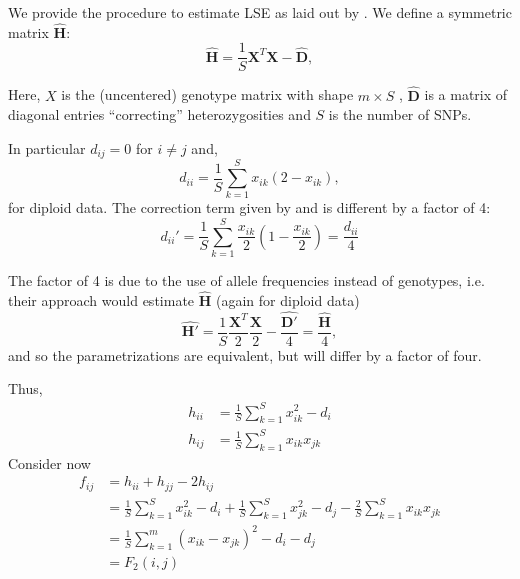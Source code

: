 \documentclass[12pt, letterpaper]{article}
\begin{document}
We provide the procedure to estimate LSE as laid out by \cite{cabreros_likelihood-free_2019}. We define a symmetric matrix $\hat{\mathbf{H}}$:
\begin{equation}
    \hat{\mathbf{H}} = \frac{1}{S}\mathbf{X}^T\mathbf{X} - \hat{\mathbf{D}},
\end{equation}

Here, $X$ is the (uncentered) genotype matrix with shape $m \times S$ , $\hat{\mathbf{D}}$ is a matrix of diagonal entries ``correcting'' heterozygosities and $S$ is the number of SNPs.

In particular $d_{ij} = 0 $ for $i \neq j$ and, 
\begin{equation}
    d_{ii} = \frac{1}{S}\sum_{k=1}^S x_{ik}(2-x_{ik}),
\end{equation}
for diploid data. The correction term given by \cite{reich_reconstructing_2009} and \cite{patterson_ancient_2012} is different by a factor of 4:
\begin{equation*}
    d_{ii}' = \frac{1}{S}\sum_{k=1}^S \frac{x_{ik}}{2}(1-\frac{x_{ik}}{2}) = \frac{d_{ii}}{4}
\end{equation*}

The factor of 4 is due to the use of allele frequencies instead of genotypes, i.e. their approach would estimate $\hat{\mathbf{H}}$ (again for diploid data)
\begin{equation*}
    \hat{\mathbf{H}'} = \frac{1}{S}\frac{\mathbf{X}^T}{2}\frac{\mathbf{X}}{2} - \frac{\hat{\mathbf{D'}}}{4} = \frac{\hat{\mathbf{H}}}{4},
\end{equation*}
and so the parametrizations are equivalent, but will differ by a factor of four.

Thus, 
\begin{subequations}\begin{align}
    h_{ii} &= \frac{1}{S}\sum_{k=1}^S x_{ik}^2 - d_i \\
    h_{ij} &= \frac{1}{S}\sum_{k=1}^S x_{ik}x_{jk} 
\end{align}\end{subequations}
Consider now
\begin{align}
    f_{ij} &= h_{ii} + h_{jj} - 2 h_{ij}\nonumber\\
     &= \frac{1}{S}\sum_{k=1}^S x_{ik}^2 - d_i + \frac{1}{S}\sum_{k=1}^S x_{jk}^2 - d_j - \frac{2}{S}\sum_{k=1}^S x_{ik}x_{jk}\nonumber \\
    &= \frac{1}{S} \sum_{k=1}^m (x_{ik} - x_{jk})^2 - d_i - d_j \\
    &= F_2(i,j)\nonumber
\end{align}
\end{document}
